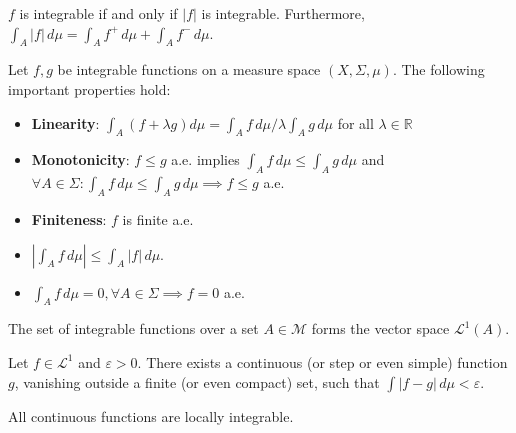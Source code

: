     \begin{property}\label{lebesgue:absolute_integrability}
        $f$ is integrable if and only if $|f|$ is integrable. Furthermore, $\int_A|f|\,d\mu = \int_Af^+\,d\mu + \int_Af^-\,d\mu$.
    \end{property}
    \begin{property}
        Let $f,g$ be integrable functions on a measure space $(X,\Sigma,\mu)$. The following important properties hold:
        \begin{itemize}
            \item\textbf{Linearity}: $\int_A(f+\lambda g)d\mu = \int_Af\,d\mu/\lambda\int_Ag\,d\mu$ for all $\lambda\in\mathbb{R}$
            \item\textbf{Monotonicity}: $f\leq g$ a.e. implies $\int_Af\,d\mu\leq\int_Ag\,d\mu$ and $\forall A\in\Sigma:\int_Af\,d\mu\leq\int_Ag\,d\mu\implies f\leq g$ a.e.
            \item\textbf{Finiteness}: $f$ is finite a.e.
            \item $|\int_Af\,d\mu|\leq\int_A|f|\,d\mu$.
            \item $\int_Af\,d\mu=0,\forall A\in\Sigma\implies f=0$ a.e.
        \end{itemize}
    \end{property}

    \begin{definition}
        The set of integrable functions over a set $A\in\mathcal{M}$ forms the vector space $\mathcal{L}^1(A)$.
    \end{definition}

    \begin{property}
        Let $f\in\mathcal{L}^1$ and $\varepsilon>0$. There exists a continuous (or step or even simple) function $g$, vanishing outside a finite (or even compact) set, such that $\int|f-g|\,d\mu<\varepsilon$.
    \end{property}

    \begin{example}
        All continuous functions are locally integrable.
    \end{example}

